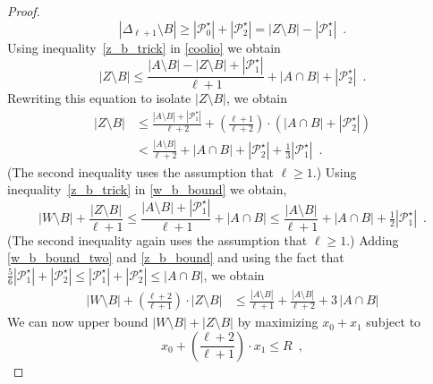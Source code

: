 \documentclass{patmorin}
\begin{document}
\begin{proof}
  \begin{equation}
      |\Delta_{\ell+1}\setminus B|\ge |\mathcal{P}_0^\star|+|\mathcal{P}^\star_2|=|Z\setminus B|-|\mathcal{P}_1^\star| \enspace . \label{z_b_trick} 
  \end{equation}
  Using inequality~\eqref{z_b_trick}  in \cref{coolio} we obtain
  \[
     |Z\setminus B| \le \frac{|A\setminus B|-|Z\setminus B|+|\mathcal{P}_1^\star|}{\ell+1}+|A\cap B|+|\mathcal{P}_2^\star| \enspace .
  \]
  Rewriting this equation to isolate $|Z\setminus B|$, we obtain
  \begin{align}
     |Z\setminus B|
      & \le \frac{|A\setminus B|+|\mathcal{P}_1^\star|}{\ell+2} + \left(\frac{\ell+1}{\ell+2}\right)\cdot
        \left(|A\cap B|+|\mathcal{P}_2^\star|\right) \\
      & < \frac{|A\setminus B|}{\ell+2} + 
        |A\cap B|+|\mathcal{P}_2^\star|+\tfrac{1}{3} |\mathcal{P}_1^\star|
        \enspace . \label{z_b_bound} 
  \end{align}
  (The second inequality uses the assumption that $\ell\ge 1$.) Using inequality~\eqref{z_b_trick}  in \cref{w_b_bound} we obtain, 
  \begin{equation}
      |W\setminus B|+\frac{|Z\setminus B|}{\ell+1}\le \frac{|A\setminus B|+|\mathcal{P}_1^\star|}{\ell+1} + |A\cap B|
      \le \frac{|A\setminus B|}{\ell+1} + |A\cap B| +\tfrac{1}{2}|\mathcal{P}_1^\star| \enspace .  \label{w_b_bound_two}
  \end{equation}
  (The second inequality again uses the assumption that $\ell\ge 1$.) Adding \eqref{w_b_bound_two} and \eqref{z_b_bound} and using the fact that $\tfrac{5}{6}|\mathcal{P}_1^\star|+|\mathcal{P}_2^\star|\le|\mathcal{P}_1^\star|+|\mathcal{P}_2^\star|\le |A\cap B|$, we obtain
  \begin{align}
    |W\setminus B| + \left(\frac{\ell+2}{\ell+1}\right)\cdot|Z\setminus B|
    & \le \frac{|A\setminus B|}{\ell+1} + 
    \frac{|A\setminus B|}{\ell+2} + 3\,|A\cap B| \label{sum_bound}
  \end{align}
  We can now upper bound $|W\setminus B|+|Z\setminus B|$ by maximizing $x_0+x_1$ subject to
  \begin{equation}
     x_0+\left(\frac{\ell+2}{\ell+1}\right)\cdot x_1 \le R \enspace , \label{sum_bound_two}   

\end{equation}
\end{proof}
\end{document}
